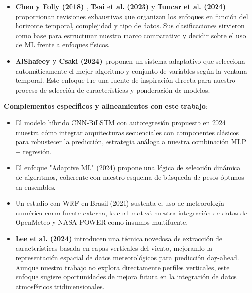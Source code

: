 \documentclass[conference]{IEEEtran}
\begin{document}
\begin{itemize}[leftmargin=*,itemsep=1pt]

\item \textbf{Chen y Folly (2018) \cite{chen2018wind}}, \textbf{Tsai et al. (2023) \cite{tsai2023review}} y \textbf{Tuncar et al. (2024) \cite{tuncar2024review}} proporcionan revisiones exhaustivas que organizan los enfoques en función del horizonte temporal, complejidad y tipo de datos. Sus clasificaciones sirvieron como base para estructurar nuestro marco comparativo y decidir sobre el uso de ML frente a enfoques físicos.

\item \textbf{AlShafeey y Csaki (2024) \cite{alshafeey2024adaptive}} proponen un sistema adaptativo que selecciona automáticamente el mejor algoritmo y conjunto de variables según la ventana temporal. Este enfoque fue una fuente de inspiración directa para nuestro proceso de selección de características y ponderación de modelos.

\end{itemize}
	
	
\textbf{Complementos específicos y alineamientos con este trabajo}:
\begin{itemize}[leftmargin=*,itemsep=1pt]

\item El modelo híbrido CNN-BiLSTM con autoregresión propuesto en 2024 \cite{zhang2024cnnbilstm} muestra cómo integrar arquitecturas secuenciales con componentes clásicos para robustecer la predicción, estrategia análoga a nuestra combinación MLP + regresión.

\item El enfoque "Adaptive ML" (2024) \cite{alshafeey2024adaptive} propone una lógica de selección dinámica de algoritmos, coherente con nuestro esquema de búsqueda de pesos óptimos en ensembles.

\item Un estudio con WRF en Brasil (2021) \cite{jacondino2021hourly} sustenta el uso de meteorología numérica como fuente externa, lo cual motivó nuestra integración de datos de OpenMeteo y NASA POWER como insumos multifuente.

\item \textbf{Lee et al. (2024) \cite{lee2024vertical}} introducen una técnica novedosa de extracción de características basada en capas verticales del viento, mejorando la representación espacial de datos meteorológicos para predicción day-ahead. Aunque nuestro trabajo no explora directamente perfiles verticales, este enfoque sugiere oportunidades de mejora futura en la integración de datos atmosféricos tridimensionales.
		
\end{itemize}
	
\end{document}
